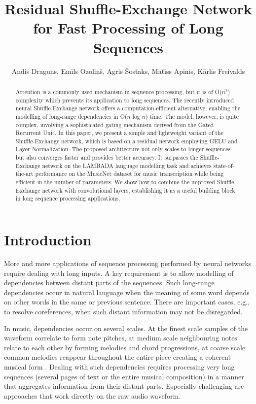 \documentclass[letterpaper]{article} %
\title{Residual Shuffle-Exchange Network \\ for Fast Processing of Long Sequences}
\author {
    Andis Draguns, Em\={\i}ls Ozoli\c{n}\v{s}, Agris \v{S}ostaks, Mat\={\i}ss Apinis, K\={a}rlis Freivalds \\
}
\begin{document}
\maketitle


\begin{abstract}
Attention is a commonly used mechanism in sequence processing, but it is of O($n^2$) complexity which prevents its application to long sequences. The recently introduced neural Shuffle-Exchange network offers a computation-efficient alternative, enabling the modelling of long-range dependencies in O($n$ log $n$) time. The model, however, is quite complex, involving a sophisticated gating mechanism derived from the Gated Recurrent Unit. In this paper, we present a simple and lightweight variant of the Shuffle-Exchange network, which is based on a residual network employing GELU and Layer Normalization. The proposed architecture not only scales to longer sequences but also converges faster and provides better accuracy. It surpasses the Shuffle-Exchange network on the LAMBADA language modelling task and achieves state-of-the-art performance on the MusicNet dataset for music transcription while being efficient in the number of parameters. We show how to combine the improved Shuffle-Exchange network with convolutional layers, establishing it as a useful building block in long sequence processing applications.
\end{abstract}


\section{Introduction}
\label{introduction}
More and more applications of sequence processing performed by neural networks require dealing with long inputs. A key requirement is to allow modelling of dependencies between distant parts of the sequences. Such long-range dependencies occur in natural language when the meaning of some word depends on other words in the same or previous sentence. There are important cases, e.g., to resolve coreferences, when such distant information may not be disregarded.

In music, dependencies occur on several scales. At the finest scale samples of the waveform correlate to form note pitches, at medium scale neighbouring notes relate to each other by forming melodies and chord progressions, at coarse scale common melodies reappear throughout the entire piece creating a coherent musical form \citep{thickstun2016learning, huang2018music}. Dealing with such dependencies requires processing very long sequences (several pages of text or the entire musical composition) in a manner that aggregates information from their distant parts. Especially challenging are approaches that work directly on the raw audio waveform.
\end{document}
